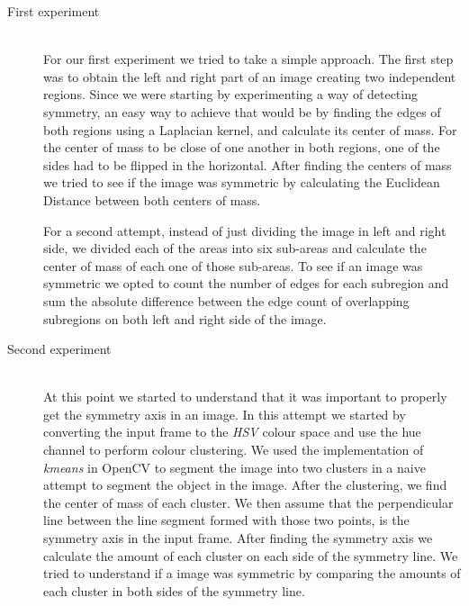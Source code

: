 \begin{description}
	\item[First experiment] \hfill \\
	For our first experiment we tried to take a simple approach. The first step was to obtain the left and right part of an image creating two independent regions. Since we were starting by experimenting a way of detecting symmetry, an easy way to achieve that would be by finding the edges of both regions using a Laplacian kernel, and calculate its center of mass. For the center of mass to be close of one another in both regions, one of the sides had to be flipped in the horizontal. After finding the centers of mass we tried to see if the image was symmetric by calculating the Euclidean Distance between both centers of mass.
	
	For a second attempt, instead of just dividing the image in left and right side, we divided each of the areas into six sub-areas and calculate the center of mass of each one of those sub-areas. To see if an image was symmetric we opted to count the number of edges for each subregion and sum the absolute difference between the edge count of overlapping subregions on both left and right side of the image.
	
	\item[Second experiment] \hfill \\
	At this point we started to understand that it was important to properly get the symmetry axis in an image. In this attempt we started by converting the input frame to the \emph{HSV} colour space and use the hue channel to perform colour clustering. We used the implementation of \emph{kmeans} in OpenCV \cite{OCV} to segment the image into two clusters in a naive attempt to segment the object in the image. After the clustering, we find the center of mass of each cluster. We then assume that the perpendicular line between the line segment formed with those two points, is the symmetry axis in the input frame. After finding the symmetry axis we calculate the amount of each cluster on each side of the symmetry line. We tried to understand if a image was symmetric by comparing the amounts of each cluster in both sides of the symmetry line.


\end{description}
